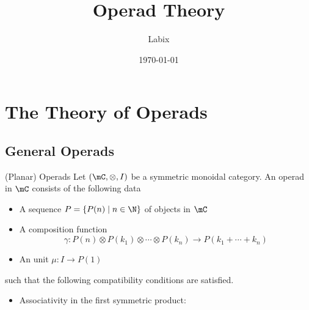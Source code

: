 \documentclass[a4paper]{article}
\title{Operad Theory}
\author{Labix}
\date{\today}
\begin{document}
\maketitle
\begin{abstract}
\begin{itemize}
\end{itemize}
\end{abstract}
\pagebreak
\tableofcontents
\pagebreak

\section{The Theory of Operads}
\subsection{General Operads}
\begin{defn}{(Planar) Operads}{} Let $(\mC,\otimes,I)$ be a symmetric monoidal category. An operad in $\mC$ consists of the following data
\begin{itemize}
\item A sequence $P=\{P(n)\;|\;n\in\N\}$ of objects in $\mC$
\item A composition function $$\gamma:P(n)\otimes P(k_1)\otimes\cdots\otimes P(k_n)\to P(k_1+\cdots+k_n)$$
\item An unit $\mu:I\to P(1)$
\end{itemize}
such that the following compatibility conditions are satisfied. 
\begin{itemize}
\item Associativity in the first symmetric product: \\~\\
\end{itemize}
\end{defn}
\end{document}
